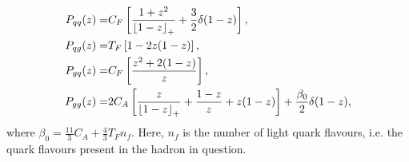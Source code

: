 \documentclass[../main.tex]{subfiles}
\begin{document}
\begin{subequations}
  \begin{align}
    P_{qq}(z) = & C_F \left[\frac{1+z^2}{\left\lfloor 1-z \right\rfloor_+} + \frac{3}{2} \delta(1-z)\right],                             \\
    P_{qg}(z) = & T_F \left[1 - 2z(1-z)\right],                                                                        \\
    P_{gq}(z) = & C_F \left[\frac{z^2 + 2(1-z)}{z}\right],                                                             \\
    P_{gg}(z) = & 2C_A \left[\frac{z}{\left\lfloor 1-z \right\rfloor_+} + \frac{1-z}{z} + z(1-z)\right] + \frac{\beta_0}{2} \delta(1-z),
  \end{align}
\end{subequations}
where \(\beta_0 = \frac{11}{3}C_A + \frac{4}{3} T_F n_f\).
Here, \(n_f\) is the number of light quark flavours, i.e. the quark flavours present in the hadron in question.
\medskip
\end{document}

